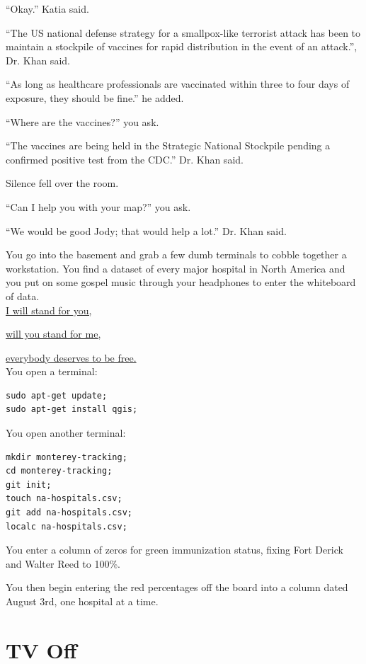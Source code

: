 \documentclass[17pt, twoside, a5paper, openright, extrafontsizes]{memoir}
\renewcommand{\emph}[1]{\ul{#1}}
\begin{document}
``Okay.'' Katia said.

``The US national defense strategy for a smallpox-like terrorist attack
has been to maintain a stockpile of vaccines for rapid distribution in
the event of an attack.'', Dr. Khan said.

``As long as healthcare professionals are vaccinated within three to
four days of exposure, they should be fine.'' he added.

``Where are the vaccines?'' you ask.

``The vaccines are being held in the Strategic National Stockpile
pending a confirmed positive test from the CDC.'' Dr. Khan said.

Silence fell over the room.

``Can I help you with your map?'' you ask.

``We would be good Jody; that would help a lot.'' Dr. Khan said.

You go into the basement and grab a few dumb terminals to cobble
together a workstation. You find a dataset of every major hospital in
North America and you put on some gospel music through your headphones
to enter the whiteboard of data.\\

\emph{I will stand for you,}

\emph{will you stand for me,}

\emph{everybody deserves to be free.}\\

You open a terminal:

\begin{verbatim}
sudo apt-get update; 
sudo apt-get install qgis;
\end{verbatim}

You open another terminal:

\begin{verbatim}
mkdir monterey-tracking;
cd monterey-tracking;
git init;
touch na-hospitals.csv;
git add na-hospitals.csv;
localc na-hospitals.csv;
\end{verbatim}

You enter a column of zeros for green immunization status, fixing Fort
Derick and Walter Reed to 100\%.

You then begin entering the red percentages off the board into a column
dated August 3rd, one hospital at a time.


\chapter{TV Off}
\end{document}
